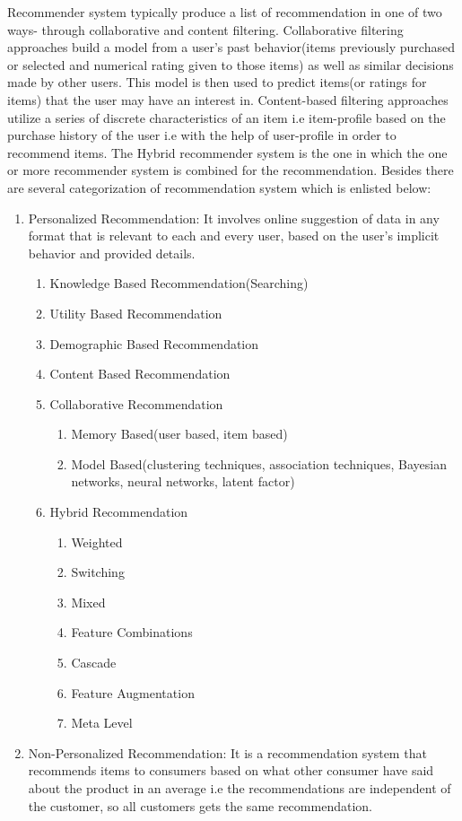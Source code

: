 Recommender system typically produce a list of recommendation in one of two ways- through collaborative and content filtering. Collaborative filtering approaches build a model from a user's past behavior(items previously purchased or selected and numerical rating given to those items) as well as similar decisions made by other users. This model is then used to predict items(or ratings for items) that the user may have an interest in. Content-based filtering approaches utilize a series of discrete characteristics of an item i.e item-profile based on the purchase history of the user i.e with the help of user-profile in order to recommend items. The Hybrid recommender system is the one in which the one or more recommender system is combined for the recommendation. Besides there are several categorization of recommendation system which is enlisted below:
\begin{enumerate}
	\item Personalized Recommendation: It involves online suggestion of data in any format that is relevant to each and every user, based on the user's implicit behavior and provided details.
	\begin{enumerate}
	\item Knowledge Based Recommendation(Searching)
	\item Utility Based Recommendation
	\item Demographic Based Recommendation
	\item Content Based Recommendation
	\item Collaborative Recommendation
		\begin{enumerate}
			\item Memory Based(user based, item based)
			\item Model Based(clustering techniques, association techniques, Bayesian networks, neural networks, latent factor)
		\end{enumerate}
	\item Hybrid Recommendation
		\begin{enumerate}
			\item Weighted
			\item Switching
			\item Mixed
			\item Feature Combinations
			\item Cascade
			\item Feature Augmentation
			\item Meta Level
		\end{enumerate}
	\end{enumerate}
	\item Non-Personalized Recommendation: It is a recommendation system that recommends items to consumers based on what other consumer have said about the product in an average i.e the recommendations are independent of the customer, so all customers gets the same recommendation.
\end{enumerate}
